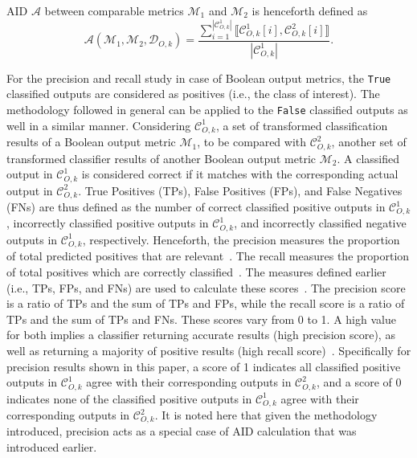 \documentclass[journal]{IEEEtran}
\begin{document}
AID $\mathcal{A}$ between comparable metrics $\mathcal{M}_1$ and $\mathcal{M}_2$ is henceforth defined as
\begin{equation}\label{eq:aid}
    \mathcal{A}(\mathcal{M}_1, \mathcal{M}_2, \mathcal{D}_{O, k})=\frac{\sum_{i=1}^{|\mathcal{C}^1_{O, k}|}\llbracket \mathcal{C}^1_{O, k}[i],\mathcal{C}^2_{O, k}[i] \rrbracket}{|\mathcal{C}^1_{O, k}|}.
\end{equation}

For the precision and recall study in case of Boolean output metrics, the \texttt{True} classified outputs are considered as positives (i.e., the class of interest). The methodology followed in general can be applied to the \texttt{False} classified outputs as well in a similar manner. Considering $\mathcal{C}^1_{O, k}$, a set of transformed classification results of a Boolean output metric $\mathcal{M}_1$, to be compared with $\mathcal{C}^2_{O, k}$, another set of transformed classifier results of another Boolean output metric $\mathcal{M}_2$. A classified output in $\mathcal{C}^1_{O, k}$ is considered correct if it matches with the corresponding actual output in $\mathcal{C}^2_{O, k}$. True Positives (TPs), False Positives (FPs), and False Negatives (FNs) are thus defined as the number of correct classified positive outputs in $\mathcal{C}^1_{O, k}$, incorrectly classified positive outputs in $\mathcal{C}^1_{O, k}$, and incorrectly classified negative outputs in $\mathcal{C}^1_{O, k}$, respectively. Henceforth, the precision measures the proportion of total predicted positives that are relevant~\cite{buckland1994relationship}. The recall measures the proportion of total positives which are correctly classified~\cite{buckland1994relationship}. The measures defined earlier (i.e., TPs, FPs, and FNs) are used to calculate these scores~\cite{powers2011evaluation}. The precision score is a ratio of TPs and the sum of TPs and FPs, while the recall score is a ratio of TPs and the sum of TPs and FNs. These scores vary from 0 to 1. A high value for both implies a classifier returning accurate results (high precision score), as well as returning a majority of positive results (high recall score)~\cite{buckland1994relationship}. Specifically for precision results shown in this paper, a score of 1 indicates all classified positive outputs in $\mathcal{C}^1_{O, k}$ agree with their corresponding outputs in $\mathcal{C}^2_{O, k}$, and a score of 0 indicates none of the classified positive outputs in $\mathcal{C}^1_{O, k}$ agree with their corresponding outputs in $\mathcal{C}^2_{O, k}$. It is noted here that given the methodology introduced, precision acts as a special case of AID calculation that was introduced earlier.
\end{document}
